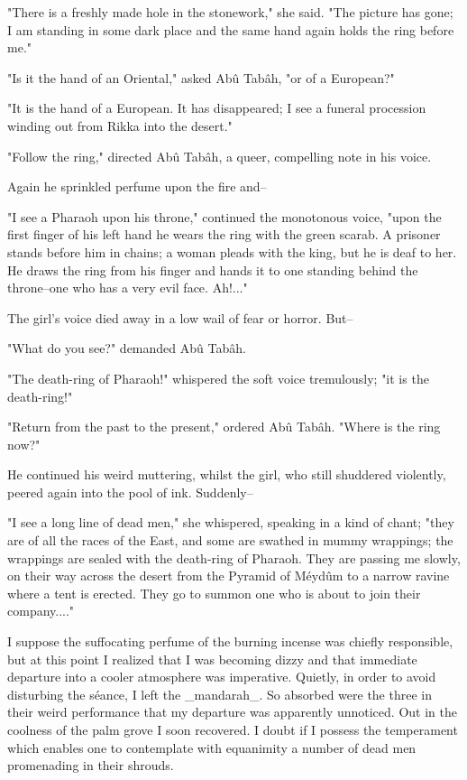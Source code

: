 "There is a freshly made hole in the stonework," she said. "The
picture has gone; I am standing in some dark place and the same hand
again holds the ring before me."

"Is it the hand of an Oriental," asked Abû Tabâh, "or of a European?"

"It is the hand of a European. It has disappeared; I see a funeral
procession winding out from Rikka into the desert."

"Follow the ring," directed Abû Tabâh, a queer, compelling note in his
voice.

Again he sprinkled perfume upon the fire and--

"I see a Pharaoh upon his throne," continued the monotonous voice,
"upon the first finger of his left hand he wears the ring with the
green scarab. A prisoner stands before him in chains; a woman pleads
with the king, but he is deaf to her. He draws the ring from his
finger and hands it to one standing behind the throne--one who has a
very evil face. Ah!..."

The girl's voice died away in a low wail of fear or horror. But--

"What do you see?" demanded Abû Tabâh.

"The death-ring of Pharaoh!" whispered the soft voice tremulously; "it
is the death-ring!"

"Return from the past to the present," ordered Abû Tabâh. "Where is
the ring now?"

He continued his weird muttering, whilst the girl, who still shuddered
violently, peered again into the pool of ink. Suddenly--

"I see a long line of dead men," she whispered, speaking in a kind of
chant; "they are of all the races of the East, and some are swathed in
mummy wrappings; the wrappings are sealed with the death-ring of
Pharaoh. They are passing me slowly, on their way across the desert
from the Pyramid of Méydûm to a narrow ravine where a tent is erected.
They go to summon one who is about to join their company...."

I suppose the suffocating perfume of the burning incense was chiefly
responsible, but at this point I realized that I was becoming dizzy
and that immediate departure into a cooler atmosphere was imperative.
Quietly, in order to avoid disturbing the séance, I left the
_mandarah_. So absorbed were the three in their weird performance that
my departure was apparently unnoticed. Out in the coolness of the palm
grove I soon recovered. I doubt if I possess the temperament which
enables one to contemplate with equanimity a number of dead men
promenading in their shrouds.


